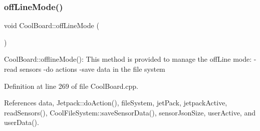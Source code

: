 \subsubsection{\texorpdfstring{off\+Line\+Mode()}{offLineMode()}}
{\footnotesize\ttfamily void Cool\+Board\+::off\+Line\+Mode (\begin{DoxyParamCaption}{ }\end{DoxyParamCaption})}

Cool\+Board\+::offline\+Mode()\+: This method is provided to manage the off\+Line mode\+: -\/read sensors -\/do actions -\/save data in the file system 

Definition at line 269 of file Cool\+Board.\+cpp.



References data, Jetpack\+::do\+Action(), file\+System, jet\+Pack, jetpack\+Active, read\+Sensors(), Cool\+File\+System\+::save\+Sensor\+Data(), sensor\+Json\+Size, user\+Active, and user\+Data().



